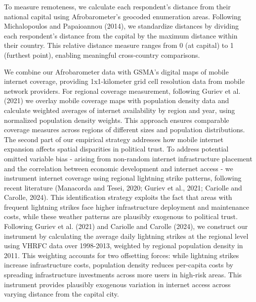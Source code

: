 \documentclass[11pt]{article}
\theoremstyle{plain}
\theoremstyle{plain}
\begin{document}
To measure remoteness, we calculate each respondent's distance from their national capital using Afrobarometer's geocoded enumeration areas. Following Michalopoulos and Papaioannou (2014), we standardize distances by dividing each respondent's distance from the capital by the maximum distance within their country. This relative distance measure ranges from 0 (at capital) to 1 (furthest point), enabling meaningful cross-country comparisons.


We combine our Afrobarometer data with GSMA's digital maps of mobile internet coverage, providing 1x1-kilometer grid cell resolution data from mobile network providers. For regional coverage measurement, following Guriev et al. (2021) we overlay mobile coverage maps with population density data and calculate weighted averages of internet availability by region and year, using normalized population density weights. This approach ensures comparable coverage measures across regions of different sizes and population distributions.\\
The second part of our empirical strategy addresses how mobile internet expansion affects spatial disparities in political trust. To address potential omitted variable bias - arising from non-random internet infrastructure placement and the correlation between economic development and internet access - we instrument internet coverage using regional lightning strike patterns, following recent literature (Manacorda and Tesei, 2020; Guriev et al., 2021; Cariolle and Carolle, 2024). This identification strategy exploits the fact that areas with frequent lightning strikes face higher infrastructure deployment and maintenance costs, while these weather patterns are plausibly exogenous to political trust. Following Guriev et al. (2021) and Cariolle and Carolle (2024), we construct our instrument by calculating the average daily lightning strikes at the regional level using VHRFC data over 1998-2013, weighted by regional population density in 2011. This weighting accounts for two offsetting forces: while lightning strikes increase infrastructure costs, population density reduces per-capita costs by spreading infrastructure investments across more users in high-risk areas. This instrument provides plausibly exogenous variation in internet access across varying distance from the capital city.
\end{document}
